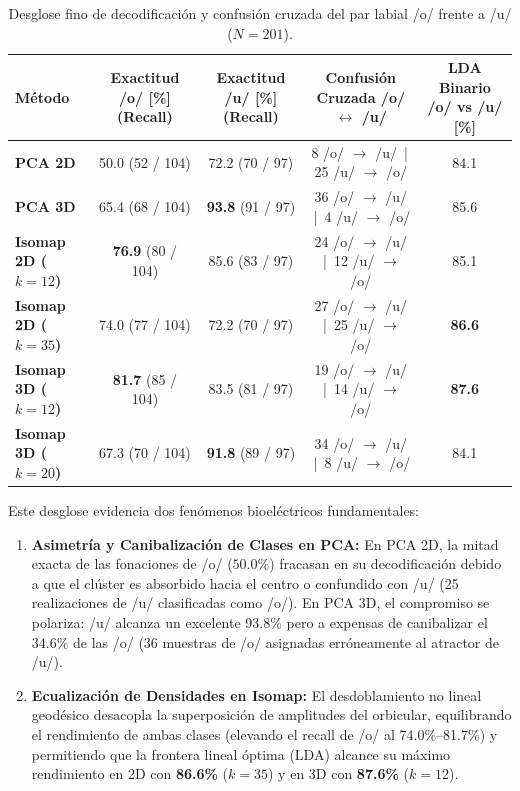 \documentclass[11pt,a4paper,openany]{book}
\theoremstyle{definition}
\begin{document}
\begin{table}[H]
\centering
\small
\begin{tabular}{lcccc}
\toprule
\textbf{Método} & \textbf{Exactitud /o/ [\%] (Recall)} & \textbf{Exactitud /u/ [\%] (Recall)} & \textbf{Confusión Cruzada /o/ $\leftrightarrow$ /u/} & \textbf{LDA Binario /o/ vs /u/ [\%]} \\
\midrule
\textbf{PCA 2D}          & 50.0 (52 / 104) & 72.2 (70 / 97) & 8 /o/ $\to$ /u/ \,|\, 25 /u/ $\to$ /o/ & 84.1 \\
\textbf{PCA 3D}          & 65.4 (68 / 104) & \textbf{93.8} (91 / 97) & 36 /o/ $\to$ /u/ \,|\, 4 /u/ $\to$ /o/ & 85.6 \\
\midrule
\textbf{Isomap 2D ($k=12$)} & \textbf{76.9} (80 / 104) & 85.6 (83 / 97) & 24 /o/ $\to$ /u/ \,|\, 12 /u/ $\to$ /o/ & 85.1 \\
\textbf{Isomap 2D ($k=35$)} & 74.0 (77 / 104) & 72.2 (70 / 97) & 27 /o/ $\to$ /u/ \,|\, 25 /u/ $\to$ /o/ & \textbf{86.6} \\
\midrule
\textbf{Isomap 3D ($k=12$)} & \textbf{81.7} (85 / 104) & 83.5 (81 / 97) & 19 /o/ $\to$ /u/ \,|\, 14 /u/ $\to$ /o/ & \textbf{87.6} \\
\textbf{Isomap 3D ($k=20$)} & 67.3 (70 / 104) & \textbf{91.8} (89 / 97) & 34 /o/ $\to$ /u/ \,|\, 8 /u/ $\to$ /o/ & 84.1 \\
\bottomrule
\end{tabular}
\caption{Desglose fino de decodificación y confusión cruzada del par labial /o/ frente a /u/ ($N = 201$).}
\label{tab:confusion_cruzada_o_u}
\end{table}

Este desglose evidencia dos fenómenos bioeléctricos fundamentales:
\begin{enumerate}
    \item \textbf{Asimetría y Canibalización de Clases en PCA:} En PCA 2D, la mitad exacta de las fonaciones de /o/ ($50.0\%$) fracasan en su decodificación debido a que el clúster es absorbido hacia el centro o confundido con /u/ (25 realizaciones de /u/ clasificadas como /o/). En PCA 3D, el compromiso se polariza: /u/ alcanza un excelente 93.8\% pero a expensas de canibalizar el 34.6\% de las /o/ (36 muestras de /o/ asignadas erróneamente al atractor de /u/).
    \item \textbf{Ecualización de Densidades en Isomap:} El desdoblamiento no lineal geodésico desacopla la superposición de amplitudes del orbicular, equilibrando el rendimiento de ambas clases (elevando el recall de /o/ al 74.0\%--81.7\%) y permitiendo que la frontera lineal óptima (LDA) alcance su máximo rendimiento en 2D con \textbf{86.6\%} ($k = 35$) y en 3D con \textbf{87.6\%} ($k = 12$).
\end{enumerate}
\end{document}
